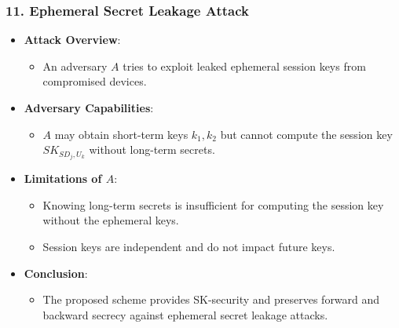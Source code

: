 \documentclass[9pt,handout]{beamer}
\begin{document}
\begin{frame}
    \frametitle{11. Ephemeral Secret Leakage Attack}
    \begin{itemize}
        \item \textbf{Attack Overview}:
            \begin{itemize}
                \item An adversary \( A \) tries to exploit leaked ephemeral session keys from compromised devices.
            \end{itemize}
        \item \textbf{Adversary Capabilities}:
            \begin{itemize}
                \item \( A \) may obtain short-term keys \( k_1, k_2 \) but cannot compute the session key \( SK_{SD_j, U_k} \) without long-term secrets.
            \end{itemize}
        \item \textbf{Limitations of \( A \)}:
            \begin{itemize}
                \item Knowing long-term secrets is insufficient for computing the session key without the ephemeral keys.
                \item Session keys are independent and do not impact future keys.
            \end{itemize}
        \item \textbf{Conclusion}:
            \begin{itemize}
                \item The proposed scheme provides SK-security and preserves forward and backward secrecy against ephemeral secret leakage attacks.
            \end{itemize}
    \end{itemize}
\end{frame}
\end{document}
